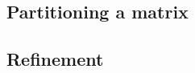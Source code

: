 \documentclass{stfc}
\newcommand{\libraryname}{HSL}
\newcommand{\packagename}{MC70}
\newcommand{\fullpackagename}{\libraryname\_\packagename}
\begin{document}
\subsection{Partitioning a matrix}





\subsection{Refinement}\label{sec:ref}

\hslexample
\end{document}
